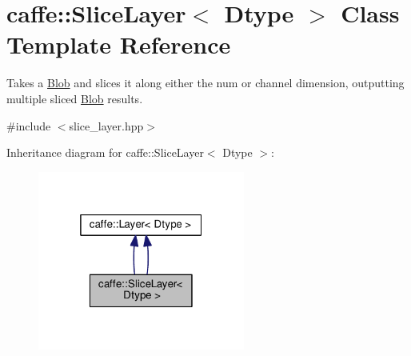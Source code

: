 \hypertarget{classcaffe_1_1_slice_layer}{}\section{caffe\+:\+:Slice\+Layer$<$ Dtype $>$ Class Template Reference}
\label{classcaffe_1_1_slice_layer}


Takes a \mbox{\hyperlink{classcaffe_1_1_blob}{Blob}} and slices it along either the num or channel dimension, outputting multiple sliced \mbox{\hyperlink{classcaffe_1_1_blob}{Blob}} results.  




{\ttfamily \#include $<$slice\+\_\+layer.\+hpp$>$}



Inheritance diagram for caffe\+:\+:Slice\+Layer$<$ Dtype $>$\+:
\nopagebreak
\begin{figure}[H]
\begin{center}
\leavevmode
\includegraphics[width=193pt]{classcaffe_1_1_slice_layer__inherit__graph}
\end{center}
\end{figure}
